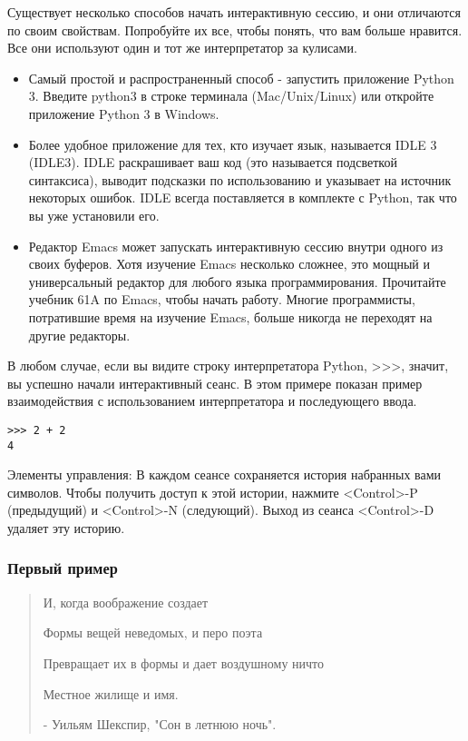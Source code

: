 Существует несколько способов начать интерактивную сессию, и они отличаются по своим свойствам. Попробуйте их все, чтобы понять, что вам больше нравится. Все они используют один и тот же интерпретатор за кулисами.
\begin{itemize}
  \item Самый простой и распространенный способ - запустить приложение Python 3. Введите python3 в строке терминала (Mac/Unix/Linux) или откройте приложение Python 3 в Windows.
  \item Более удобное приложение для тех, кто изучает язык, называется IDLE 3 (IDLE3). IDLE раскрашивает ваш код (это называется подсветкой синтаксиса), выводит подсказки по использованию и указывает на источник некоторых ошибок. IDLE всегда поставляется в комплекте с Python, так что вы уже установили его.
  \item Редактор Emacs может запускать интерактивную сессию внутри одного из своих буферов. Хотя изучение Emacs несколько сложнее, это мощный и универсальный редактор для любого языка программирования. Прочитайте учебник 61A по Emacs, чтобы начать работу. Многие программисты, потратившие время на изучение Emacs, больше никогда не переходят на другие редакторы.
\end{itemize}

В любом случае, если вы видите строку интерпретатора Python, >>>, значит, вы успешно начали интерактивный сеанс. В этом примере показан пример взаимодействия с использованием интерпретатора и последующего ввода.

\begin{verbatim}
>>> 2 + 2
4
\end{verbatim}

Элементы управления: В каждом сеансе сохраняется история набранных вами символов. Чтобы получить доступ к этой истории, нажмите <Control>-P (предыдущий) и <Control>-N (следующий). Выход из сеанса <Control>-D удаляет эту историю.

\subsubsection{Первый пример}
\begin{quotation}
И, когда воображение создает

Формы вещей неведомых, и перо поэта

Превращает их в формы и дает воздушному ничто

Местное жилище и имя.

- Уильям Шекспир, "Сон в летнюю ночь".
\end{quotation}

